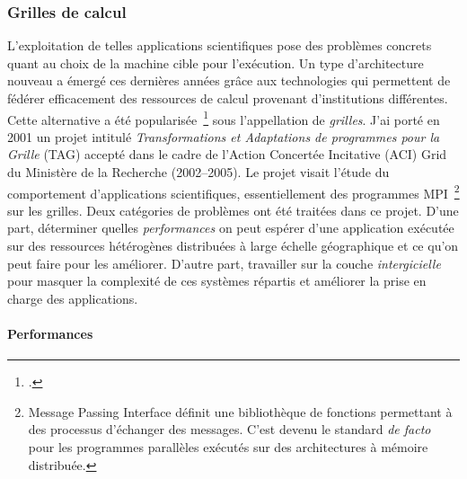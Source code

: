 \documentclass[11pt]{article}
\begin{document}
\subsubsection{Grilles de calcul}

L'exploitation de telles applications scientifiques pose des problèmes concrets 
quant au choix de la machine cible pour l'exécution. Un type d'architecture 
nouveau a émergé ces dernières années grâce aux technologies qui permettent
de fédérer efficacement des ressources de calcul provenant d'institutions 
différentes. Cette alternative a été popularisée~\footcite{Foster97,Foster98} 
sous l'appellation de \emph{grilles}. J'ai porté en 2001 un projet intitulé 
\textit{Transformations et Adaptations de programmes pour la Grille} (TAG)
accepté dans le cadre de l'Action Concertée Incitative (ACI) Grid du Ministère 
de la Recherche (2002--2005). Le projet visait l'étude du comportement 
d'applications scientifiques, essentiellement des programmes MPI~\footnote{%
Message Passing Interface définit une bibliothèque de fonctions permettant 
à des processus d'échanger des messages. C'est devenu le standard \textit{de 
facto} pour les programmes parallèles exécutés sur des architectures à mémoire 
distribuée.} sur les grilles. Deux catégories de problèmes ont été traitées 
dans ce projet. D'une part, déterminer quelles \emph{performances} on peut 
espérer d'une application exécutée sur des ressources hétérogènes distribuées 
à large échelle géographique et ce qu'on peut faire pour les améliorer.
D'autre part, travailler sur la couche \emph{intergicielle} pour masquer la 
complexité de ces systèmes répartis et améliorer la prise en charge des 
applications.


\paragraph{Performances} 
\end{document}
